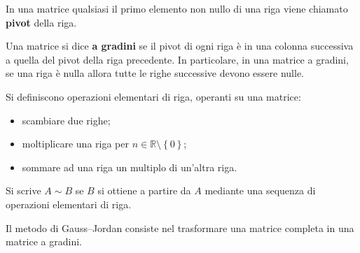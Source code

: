 \begin{definition}[Pivot]
  In una matrice qualsiasi il primo elemento non nullo di una riga viene chiamato \textbf{pivot} della riga.
\end{definition}
  
\begin{definition}
  Una matrice si dice \textbf{a gradini} se il pivot di ogni riga è in una colonna successiva a quella del pivot della riga precedente.
  In particolare, in una matrice a gradini, se una riga è nulla allora tutte le righe successive devono essere nulle.
\end{definition}
  

Si definiscono operazioni elementari di riga, operanti su una matrice:
\begin{itemize}
  \item scambiare due righe;
  \item moltiplicare una riga per $n\in\mathbb{R}\setminus\left\{ 0 \right\}$;
  \item sommare ad una riga un multiplo di un'altra riga.
\end{itemize}
Si scrive $A\sim B$ se $B$ si ottiene a partire da $A$ mediante una sequenza di operazioni elementari di riga.

Il metodo di Gauss--Jordan consiste nel trasformare una matrice completa in una matrice a gradini.

